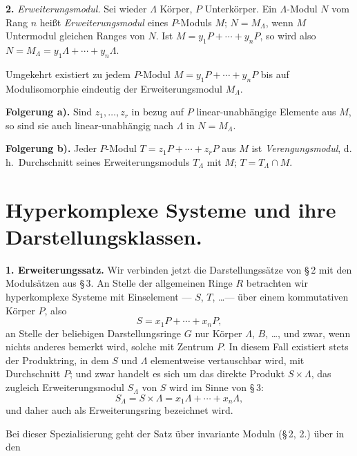 \documentclass[12pt,a4paper]{article}
\theoremstyle{plain}
\begin{document}
\medskip
\noindent\textbf{2.}\hspace{0.5em}%
\emph{Erweiterungsmodul.} Sei wieder $\Lambda$ K\"orper, $P$ Unterk\"orper.
Ein $\Lambda$-Modul $N$ vom Rang $n$ hei\ss t \emph{Erweiterungsmodul} eines $P$-Moduls
$M$; $N = M_\Lambda$, wenn $M$ Untermodul gleichen Ranges von $N$. Ist
$M = y_1 P + \cdots + y_n P$, so wird also $N = M_\Lambda = y_1 \Lambda + \cdots + y_n \Lambda$.

Umgekehrt existiert zu jedem $P$-Modul $M = y_1 P + \cdots + y_n P$ bis auf
Modulisomorphie eindeutig der Erweiterungsmodul $M_\Lambda$.

\medskip
\noindent\textbf{Folgerung a).}\hspace{0.5em}%
Sind $z_1, \ldots, z_r$ in bezug auf $P$ linear-unabh\"angige
Elemente aus $M$, so sind sie auch linear-unabh\"angig nach $\Lambda$ in $N = M_\Lambda$.

\medskip
\noindent\textbf{Folgerung b).}\hspace{0.5em}%
Jeder $P$-Modul $T = z_1 P + \cdots + z_r P$ aus $M$ ist
\emph{Verengungsmodul}, d.\,h.\ Durchschnitt seines Erweiterungsmoduls $T_\Lambda$ mit
$M$; $T = T_\Lambda \cap M$.

\section{Hyperkomplexe Systeme und ihre Darstellungsklassen.}
\label{sec:hyperkomplex}

\medskip
\noindent\textbf{1. Erweiterungssatz.}\hspace{0.5em}%
Wir verbinden jetzt die Darstellungss\"atze
von \S\,2 mit den Moduls\"atzen aus \S\,3. An Stelle der allgemeinen Ringe $R$
betrachten wir hyperkomplexe Systeme mit Einselement --- $S$, $T$, \ldots --- \"uber
einem kommutativen K\"orper $P$, also
\[
S = x_1 P + \cdots + x_n P,
\]
an Stelle der beliebigen Darstellungsringe $G$ nur K\"orper $\Lambda$, $B$, \ldots, und
zwar, wenn nichts anderes bemerkt wird, solche mit Zentrum $P$. In
diesem Fall existiert stets der Produktring, in dem $S$ und $\Lambda$ elementweise
vertauschbar wird, mit Durchschnitt $P$; und zwar handelt es sich
um das direkte Produkt $S \times \Lambda$, das zugleich Erweiterungsmodul $S_\Lambda$ von $S$
wird im Sinne von \S\,3:
\[
S_\Lambda = S \times \Lambda = x_1 \Lambda + \cdots + x_n \Lambda,
\]
und daher auch als Erweiterungsring bezeichnet wird.

Bei dieser Spezialisierung geht der Satz \"uber invariante Moduln
(\S\,2, 2.) \"uber in den
\end{document}
